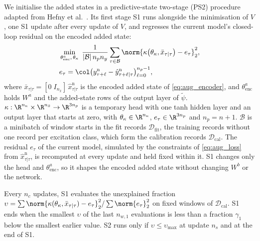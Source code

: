 We initialise the added states in a predictive-state two-stage (PS2)
procedure adapted from Hefny et al.~\cite[Sec.~3]{hefny2015supervised}.
Its first stage S1 runs alongside the minimisation of $V$, one S1 update after every update
of $V$, and regresses the current model's closed-loop residual on the encoded
added state:
\begin{equation}
\begin{aligned}
 &\min_{\theta^a_{\mathrm{enc}},\,\theta_\kappa}\;
  \frac{1}{|\mathcal B|\,n_pn_y}\sum_{\tau\in\mathcal B}
  \norm{\kappa\bigl(\theta_\kappa,\bar x_{\tau|\tau}\bigr)-e_\tau}_2^2,\\
 &e_\tau=\col\bigl(y^{\mathrm n}_{\tau+\ell}
   -\hat y^{\mathrm n}_{\tau+\ell|\tau}\bigr)_{\ell=0}^{n_p-1},
\end{aligned}
\label{eq:ps2_s1}
\end{equation}
where $\bar x_{\tau|\tau}=[0\;I_{n_{\bar x}}]\,\hat x^{\mathrm n}_{\tau|\tau}$
is the encoded added state of \eqref{eq:aug_encoder}, and
$\theta^a_{\mathrm{enc}}$ holds $W^a$ and the added-state rows of the output
layer of $\tilde\psi$.
$\kappa:\R^{n_\kappa}\times\R^{n_{\bar x}}\to\R^{3n_p}$ is a temporary head with
one tanh hidden layer and an output layer that starts at zero, with
$\theta_\kappa\in\R^{n_\kappa}$, $e_\tau\in\R^{3n_p}$ and $n_p=n+1$.
$\mathcal B$ is a minibatch of window starts in the fit records
$\mathcal D_{\mathrm{fit}}$, the training records without one record per
excitation class, which form the calibration records
$\mathcal D_{\mathrm{cal}}$.
The residual $e_\tau$ of the current model, simulated by the constraints of
\eqref{eq:aug_loss} from $\hat x^{\mathrm n}_{\tau|\tau}$, is recomputed at
every update and held fixed within it.
S1 changes only the head and $\theta^a_{\mathrm{enc}}$, so it shapes the
encoded added state without changing $W^b$ or the network.

Every $n_c$ updates, S1 evaluates the unexplained fraction
$\upsilon=\sum\norm{\kappa(\theta_\kappa,\bar x_{\tau|\tau})-e_\tau}_2^2/\sum\norm{e_\tau}_2^2$
on fixed windows of $\mathcal D_{\mathrm{cal}}$.
S1 ends when the smallest $\upsilon$ of the last $n_{w,1}$ evaluations is
less than a fraction $\gamma_1$ below the smallest earlier value.
S2 runs only if $\upsilon\le\upsilon_{\max}$ at update $n_s$ and at the end of
S1.

